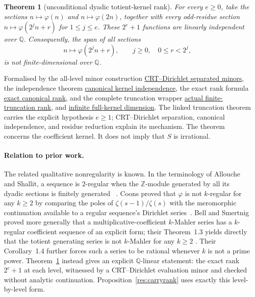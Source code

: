 \documentclass[11pt]{article}
\newcommand{\commit}{99f4bf47422abbd8757cbb22b50ba079d764d3a7}
\newcommand{\repobase}{https://github.com/wcook04/plectis-erdos/blob/\commit}
\newcommand{\PK}{Erdos249257}
\newcommand{\lword}[4]{\href{\repobase/\PK/#1\#L#2}{#4}}
\newtheorem{theorem}{Theorem}[section]
\theoremstyle{definition}
\theoremstyle{remark}
\newcommand{\Z}{\mathbb{Z}}
\newcommand{\Q}{\mathbb{Q}}
\newcommand{\ph}{\varphi}
\begin{document}
{\begin{theorem}[unconditional dyadic totient-kernel rank]
\label{res:dyadictotient}
For every $e\geq0$, take the sections $n\mapsto\ph(n)$ and
$n\mapsto\ph(2n)$, together with every odd-residue section
$n\mapsto\ph(2^jn+r)$ for $1\leq j\leq e$.  These $2^e+1$ functions are
linearly independent over $\Q$.
Consequently, the span of all sections
\[
 n\longmapsto \ph(2^j n+r),\qquad j\geq0,\quad 0\leq r<2^j,
\]
is not finite-dimensional over $\Q$.
\end{theorem}
\noindent Formalised by the all-level minor construction
\lword{TotientMahlerDefect.lean}{882}{exists_separatedMinorCertificate_totientAffineOddFamily}{CRT--Dirichlet separated minors},
the independence theorem
\lword{TotientMahlerDefect.lean}{935}{linearIndependent_canonicalTotientKernelFamily}{canonical kernel independence},
the exact rank formula
\lword{TotientMahlerDefect.lean}{989}{finrank_canonicalTotientKernel_eq}{exact canonical rank},
and the complete truncation wrapper
\lword{TotientMahlerDefect.lean}{1084}{finrank_totientKernelThroughLevelFamily_eq}{actual finite-truncation rank},
and
\lword{TotientMahlerDefect.lean}{1145}{not_finiteDimensional_span_fullTotientKernel}{infinite full-kernel dimension}.
The linked truncation theorem carries the explicit hypothesis $e\ge1$;
CRT--Dirichlet separation, canonical independence, and residue reduction explain
its mechanism.  The theorem concerns the coefficient kernel.  It does not imply that $S$ is
irrational.

\paragraph{Relation to prior work.}
The related qualitative nonregularity is known.  In the terminology of
Allouche and Shallit, a sequence is $2$-regular when the $\Z$-module generated
by all its dyadic sections is finitely generated
~\cite[Defs.~1.1 and~2.1, author-preprint pp.~2--3]{alloucheshallit}.
Coons proved that $\ph$ is not $k$-regular for any $k\geq2$ by comparing the
poles of $\zeta(s-1)/\zeta(s)$ with the meromorphic continuation available to
a regular sequence's Dirichlet series~\cite[Theorem~3.2, pp.~348--349]{coons2010}.
Bell and Smertnig proved more generally that a multiplicative-coefficient
\(k\)-Mahler series has a \(k\)-regular coefficient sequence of an explicit
form; their Theorem~1.3 yields directly that the totient generating series is
not \(k\)-Mahler for any \(k\ge2\)
\cite[Theorem~1.3, pp.~2--3]{bellsmertnig2026}.  Their Corollary~1.4 further
forces such a series to be rational whenever \(k\) is not a prime power.
Theorem~\ref{res:dyadictotient} instead gives an explicit $\Q$-linear statement:
the exact rank $2^e+1$ at each level, witnessed by a CRT--Dirichlet evaluation
minor and checked without analytic continuation.
Proposition~\ref{res:carryrank} uses exactly this level-by-level form.

}
\end{document}

